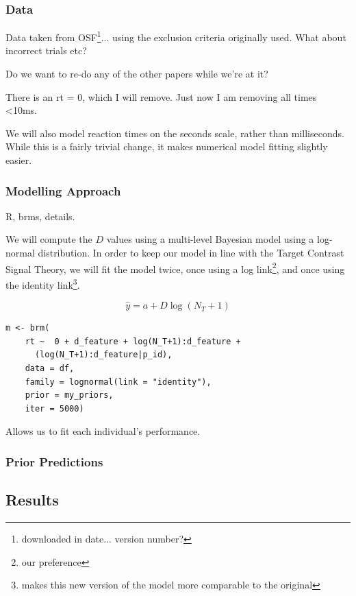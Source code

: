 \documentclass[smallextended]{svjour3}       %
\begin{document}
\subsubsection{Data}

Data taken from OSF\footnote{downloaded in date... version number?}... using the exclusion criteria originally used. What about incorrect trials etc? 

Do we want to re-do any of the other papers while we're at it?

There is an rt = 0, which I will remove. Just now I am removing all times <10ms. 

 We will also model reaction times on the seconds scale, rather than milliseconds. While this is a fairly trivial change, it makes numerical model fitting slightly easier. 

\subsubsection{Modelling Approach}

R, brms, details.

We will compute the $D$ values using a multi-level Bayesian model using a log-normal distribution. In order to keep our model in line with the Target Contrast Signal Theory, we will fit the model twice, once using a log link\footnote{our preference}, and once using the identity link\footnote{makes this new version of the model more comparable to the original}.

\begin{equation}
\hat{y} = a + D\log(N_T + 1)
\label{eq:computeDlm}
\end{equation}

\begin{verbatim}
m <- brm(
    rt ~  0 + d_feature + log(N_T+1):d_feature + 
      (log(N_T+1):d_feature|p_id),
    data = df,
    family = lognormal(link = "identity"),
    prior = my_priors,
    iter = 5000)
\end{verbatim}

Allows us to fit each individual's performance.

\subsubsection{Prior Predictions}

\subsection{Results}
\end{document}
